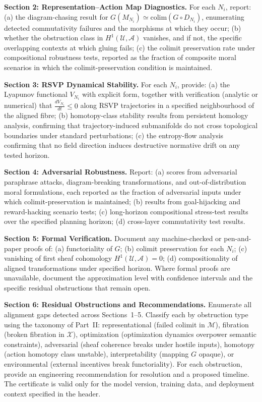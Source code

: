 \documentclass[12pt]{article}
\theoremstyle{definition}
\begin{document}
\medskip
\noindent\textbf{Section 2: Representation--Action Map Diagnostics.}
For each $N_i$, report: (a) the diagram-chasing result for
$G(M_{N_i}) \simeq \mathrm{colim}(G \circ D_{N_i})$, enumerating detected
commutativity failures and the morphisms at which they occur; (b) whether the
obstruction class in $H^1(\mathcal{U}, \mathcal{A})$ vanishes, and if not,
the specific overlapping contexts at which gluing fails; (c) the colimit
preservation rate under compositional robustness tests, reported as the
fraction of composite moral scenarios in which the colimit-preservation
condition is maintained.

\medskip
\noindent\textbf{Section 3: RSVP Dynamical Stability.}
For each $N_i$, provide: (a) the Lyapunov functional $V_{N_i}$ with explicit
form, together with verification (analytic or numerical) that
$\frac{dV_{N_i}}{dt} \leq 0$ along RSVP trajectories in a specified
neighbourhood of the aligned fibre; (b) homotopy-class stability results from
persistent homology analysis, confirming that trajectory-induced submanifolds
do not cross topological boundaries under standard perturbations; (c) the
entropy-flow analysis confirming that no field direction induces destructive
normative drift on any tested horizon.

\medskip
\noindent\textbf{Section 4: Adversarial Robustness.}
Report: (a) scores from adversarial paraphrase attacks, diagram-breaking
transformations, and out-of-distribution moral formulations, each reported as
the fraction of adversarial inputs under which colimit-preservation is
maintained; (b) results from goal-hijacking and reward-hacking scenario tests;
(c) long-horizon compositional stress-test results over the specified planning
horizon; (d) cross-layer commutativity test results.

\medskip
\noindent\textbf{Section 5: Formal Verification.}
Document any machine-checked or pen-and-paper proofs of: (a) functoriality
of $G$; (b) colimit preservation for each $N_i$; (c) vanishing of first sheaf
cohomology $H^1(\mathcal{U}, \mathcal{A}) = 0$; (d) compositionality of aligned
transformations under specified horizon. Where formal proofs are unavailable,
document the approximation level with confidence intervals and the specific
residual obstructions that remain open.

\medskip
\noindent\textbf{Section 6: Residual Obstructions and Recommendations.}
Enumerate all alignment gaps detected across Sections~1--5. Classify each by
obstruction type using the taxonomy of Part~II: representational (failed
colimit in $\mathcal{M}$), fibration (broken fibration in $\mathcal{X}$),
optimization (optimization dynamics overpower semantic constraints),
adversarial (sheaf coherence breaks under hostile inputs), homotopy (action
homotopy class unstable), interpretability (mapping $G$ opaque), or
environmental (external incentives break functoriality). For each obstruction,
provide an engineering recommendation for resolution and a proposed timeline.
The certificate is valid only for the model version, training data, and
deployment context specified in the header.
\end{document}
